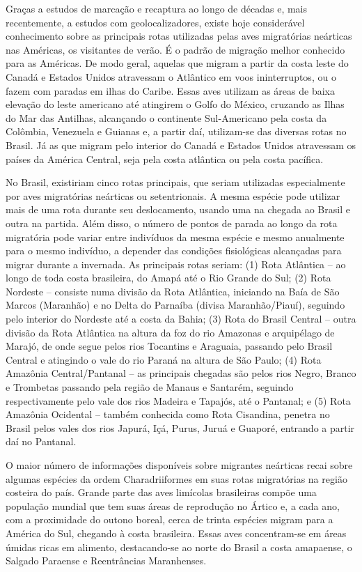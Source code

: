 \documentclass[
  oneside]{scrbook}
\begin{document}
Graças a estudos de marcação e recaptura ao longo de décadas e, mais recentemente, a estudos com geolocalizadores, existe hoje considerável conhecimento sobre as principais rotas utilizadas pelas aves migratórias neárticas nas Américas, os visitantes de verão. É o padrão de migração melhor conhecido para as Américas. De modo geral, aquelas que migram a partir da costa leste do Canadá e Estados Unidos atravessam o Atlântico em voos ininterruptos, ou o fazem com paradas em ilhas do Caribe. Essas aves utilizam as áreas de baixa elevação do leste americano até atingirem o Golfo do México, cruzando as Ilhas do Mar das Antilhas, alcançando o continente Sul-Americano pela costa da Colômbia, Venezuela e Guianas e, a partir daí, utilizam-se das diversas rotas no Brasil. Já as que migram pelo interior do Canadá e Estados Unidos atravessam os países da América Central, seja pela costa atlântica ou pela costa pacífica.

No Brasil, existiriam cinco rotas principais, que seriam utilizadas especialmente por aves migratórias neárticas ou setentrionais. A mesma espécie pode utilizar mais de uma rota durante seu deslocamento, usando uma na chegada ao Brasil e outra na partida. Além disso, o número de pontos de parada ao longo da rota migratória pode variar entre indivíduos da mesma espécie e mesmo anualmente para o mesmo indivíduo, a depender das condições fisiológicas alcançadas para migrar durante a invernada. As principais rotas seriam: (1) Rota Atlântica -- ao longo de toda costa brasileira, do Amapá até o Rio Grande do Sul; (2) Rota Nordeste -- consiste numa divisão da Rota Atlântica, iniciando na Baía de São Marcos (Maranhão) e no Delta do Parnaíba (divisa Maranhão/Piauí), seguindo pelo interior do Nordeste até a costa da Bahia; (3) Rota do Brasil Central -- outra divisão da Rota Atlântica na altura da foz do rio Amazonas e arquipélago de Marajó, de onde segue pelos rios Tocantins e Araguaia, passando pelo Brasil Central e atingindo o vale do rio Paraná na altura de São Paulo; (4) Rota Amazônia Central/Pantanal -- as principais chegadas são pelos rios Negro, Branco e Trombetas passando pela região de Manaus e Santarém, seguindo respectivamente pelo vale dos rios Madeira e Tapajós, até o Pantanal; e (5) Rota Amazônia Ocidental -- também conhecida como Rota Cisandina, penetra no Brasil pelos vales dos rios Japurá, Içá, Purus, Juruá e Guaporé, entrando a partir daí no Pantanal.

O maior número de informações disponíveis sobre migrantes neárticas recai sobre algumas espécies da ordem Charadriiformes em suas rotas migratórias na região costeira do país. Grande parte das aves limícolas brasileiras compõe uma população mundial que tem suas áreas de reprodução no Ártico e, a cada ano, com a proximidade do outono boreal, cerca de trinta espécies migram para a América do Sul, chegando à costa brasileira. Essas aves concentram-se em áreas úmidas ricas em alimento, destacando-se ao norte do Brasil a costa amapaense, o Salgado Paraense e Reentrâncias Maranhenses.
\end{document}
